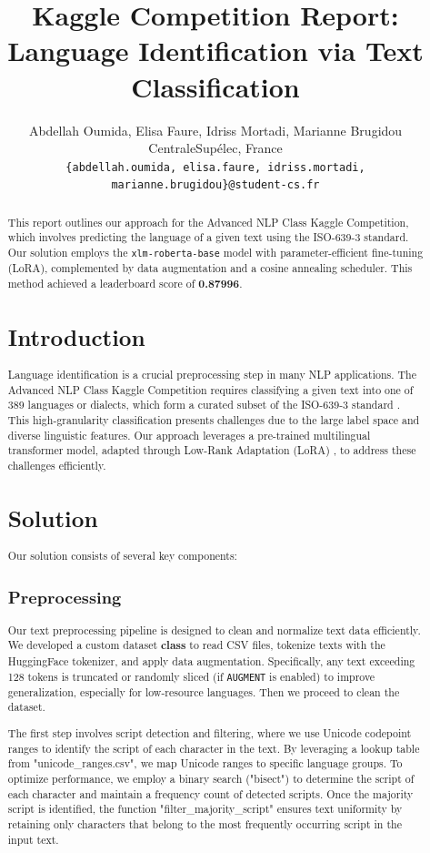 \documentclass[11pt]{article}
\title{Kaggle Competition Report: Language Identification via Text Classification}
\author{
    Abdellah Oumida, Elisa Faure, Idriss Mortadi, Marianne Brugidou \\
    CentraleSupélec, France \\
    \texttt{\{abdellah.oumida, elisa.faure, idriss.mortadi, marianne.brugidou\}@student-cs.fr}
}
\begin{document}
\maketitle

\begin{abstract}
This report outlines our approach for the Advanced NLP Class Kaggle Competition, which involves predicting the language of a given text using the ISO-639-3 standard. Our solution employs the \texttt{xlm-roberta-base} model with parameter-efficient fine-tuning (LoRA), complemented by data augmentation and a cosine annealing scheduler. This method achieved a leaderboard score of \textbf{0.87996}.

\section{Introduction}
Language identification is a crucial preprocessing step in many NLP applications. The Advanced NLP Class Kaggle Competition requires classifying a given text into one of 389 languages or dialects, which form a curated subset of the ISO-639-3 standard \citep{iso639-3}. This high-granularity classification presents challenges due to the large label space and diverse linguistic features. Our approach leverages a pre-trained multilingual transformer model, adapted through Low-Rank Adaptation (LoRA) \citep{hu2022lora}, to address these challenges efficiently.

\section{Solution}
Our solution consists of several key components:
\subsection{Preprocessing}
Our text preprocessing pipeline is designed to clean and normalize text data efficiently.
We developed a custom dataset \textbf{class} to read CSV files, tokenize texts with the HuggingFace tokenizer, and apply data augmentation. Specifically, any text exceeding 128 tokens is truncated or randomly sliced (if \texttt{AUGMENT} is enabled) to improve generalization, especially for low-resource languages. Then we proceed to clean the dataset.

The first step involves script detection and filtering, where we use Unicode codepoint ranges to identify the script of each character in the text. By leveraging a lookup table from "unicode\_ranges.csv", we map Unicode ranges to specific language groups. To optimize performance, we employ a binary search ("bisect") to determine the script of each character and maintain a frequency count of detected scripts. Once the majority script is identified, the function "filter\_majority\_script" ensures text uniformity by retaining only characters that belong to the most frequently occurring script in the input text.  


\end{abstract}
\end{document}
